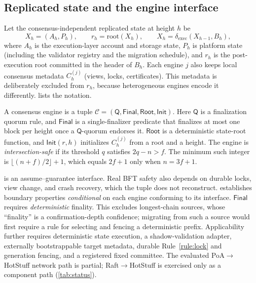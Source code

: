 \subsection{Replicated state and the engine interface}
Let the consensus-independent replicated state at height $h$ be
\begin{equation}
  X_h=(A_h,P_h),\qquad r_h=\mathrm{root}(X_h),\qquad X_h=\delta_{\mathrm{exec}}(X_{h-1},B_h),
  \label{eq:state}
\end{equation}
where $A_h$ is the execution-layer account and storage state, $P_h$ is platform state (including the
validator registry and the migration schedule), and $r_h$ is the post-execution root committed in the
header of $B_h$. Each engine $j$ also keeps local consensus metadata $C^{(j)}_h$ (views, locks,
certificates). This metadata is deliberately excluded from $r_h$, because heterogeneous engines encode
it differently.  lists the notation.

\begin{definition}
\label{def:engine}
A consensus engine is a tuple $\mathcal C=(\mathsf Q,\mathsf{Final},\mathsf{Root},\mathsf{Init})$.
Here $\mathsf Q$ is a finalization quorum rule, and $\mathsf{Final}$ is a single-finalizer predicate
that finalizes at most one block per height once a $\mathsf Q$-quorum endorses it. $\mathsf{Root}$ is
a deterministic state-root function, and $\mathsf{Init}(r,h)$ initializes $C^{(j)}_h$ from a root and
a height. The engine is \emph{intersection-safe} if its threshold $q$ satisfies $2q-n>f$. The minimum
such integer is $\lfloor (n+f)/2\rfloor+1$, which equals $2f+1$ only when $n=3f+1$.
\end{definition}

 is an assume--guarantee interface. Real BFT safety also depends on durable locks,
view change, and crash recovery, which the tuple does not reconstruct. \sage{} establishes boundary
properties \emph{conditional} on each engine conforming to its interface. $\mathsf{Final}$ requires
\emph{deterministic} finality. This excludes longest-chain sources, whose ``finality'' is a
confirmation-depth confidence; migrating from such a source would first require a rule for selecting
and fencing a deterministic prefix. Applicability further requires deterministic state execution, a
shadow-validation adapter, externally bootstrappable target metadata, durable Rule~\ref{rule:lock}
and generation fencing, and a registered fixed committee. The evaluated PoA$\to$HotStuff
network path is partial; Raft$\to$HotStuff is exercised only as a component path
(\cref{tab:status}).


